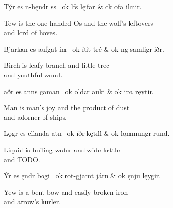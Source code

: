 \bvg\bva%
Týr es n-hęndr ss \hld\ ok lfs lęifar &
\ind ok ofa ilmir.\eva

\bvb Tew is the one-handed Os and the wolf’s leftovers \\
\ind and lord of hoves.\evb\evg


\bvg\bva%
Bjarkan es aufgat im \hld\ ok ítit tré &
\ind ok ng-samligr iðr.\eva

\bvb Birch is leafy branch and little tree \\
\ind and youthful wood.\evb\evg


\bvg\bva%
aðr es anns gaman \hld\ ok oldar auki &
\ind ok ipa ręytir.\eva

\bvb Man is man’s joy and the product of dust \\
\ind and adorner of ships.\evb\evg


\bvg\bva%
Lǫgr es ellanda atn \hld\ ok íðr kętill &
\ind ok lǫmmungr rund.\eva

\bvb Liquid is boiling water and wide kettle \\
\ind and TODO.\evb\evg


\bvg\bva%
Ýr es ęndr bogi \hld\ ok rot-gjarnt járn &
\ind ok ęnju lęygir.\eva

\bvb Yew is a bent bow and easily broken iron \\
\ind and arrow’s hurler.\evb\evg

\sectionline
